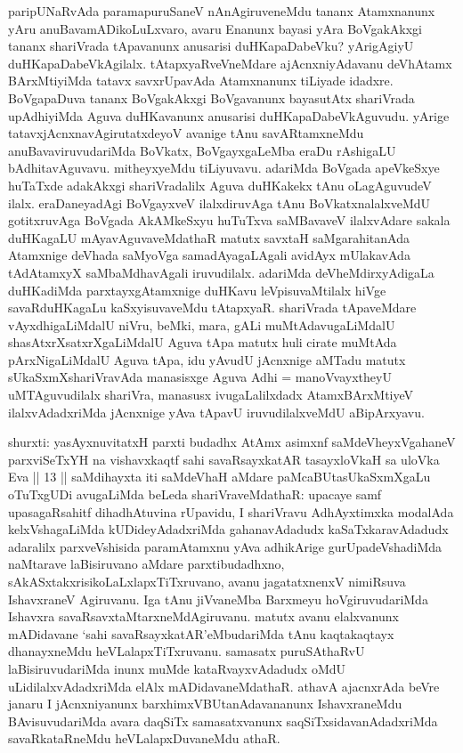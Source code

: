 \begin{artha} %
paripUNaRvAda paramapuruSaneV nAnAgiruveneMdu tananx Atamxnanunx yAru anuBavamADikoLuLxvaro, avaru Enanunx bayasi yAra BoVgakAkxgi tananx shariVrada tApavanunx anusarisi duHKapaDabeVku? yArigAgiyU duHKapaDabeVkAgilalx. tAtapxyaRveVneMdare \ndash  ajAcnxniyAdavanu deVhAtamx BArxMtiyiMda tatavx savxrUpavAda Atamxnanunx tiLiyade idadxre. BoVgapaDuva tananx BoVgakAkxgi BoVgavanunx bayasutAtx shariVrada upAdhiyiMda Aguva duHKavanunx anusarisi duHKapaDabeVkAguvudu. yArige tatavxjAcnxnavAgirutatxdeyoV avanige tAnu savARtamxneMdu anuBavaviruvudariMda BoVkatx, BoVgayxgaLeMba eraDu rAshigaLU bAdhitavAguvavu. mitheyxyeMdu tiLiyuvavu. adariMda BoVgada apeVkeSxye huTaTxde adakAkxgi shariVradalilx Aguva duHKakekx tAnu oLagAguvudeV ilalx. eraDaneyadAgi BoVgayxveV ilalxdiruvAga tAnu BoVkatxnalalxveMdU gotitxruvAga BoVgada AkAMkeSxyu huTuTxva saMBavaveV ilalxvAdare sakala duHKagaLU mAyavAguvaveMdathaR matutx savxtaH saMgarahitanAda Atamxnige deVhada saMyoVga samadAyagaLAgali avidAyx mUlakavAda tAdAtamxyX saMbaMdhavAgali iruvudilalx. adariMda deVheMdirxyAdigaLa duHKadiMda parxtayxgAtamxnige duHKavu leVpisuvaMtilalx hiVge savaRduHKagaLu kaSxyisuvaveMdu tAtapxyaR. shariVrada tApaveMdare vAyxdhigaLiMdalU niVru, beMki, mara, gALi muMtAdavugaLiMdalU shasAtxrXsatxrXgaLiMdalU Aguva tApa matutx huli cirate muMtAda pArxNigaLiMdalU Aguva tApa, idu yAvudU jAcnxnige aMTadu matutx sUkaSxmXshariVravAda manasisxge Aguva Adhi = manoVvayxtheyU uMTAguvudilalx shariVra, manasusx ivugaLalilxdadx AtamxBArxMtiyeV ilalxvAdadxriMda jAcnxnige yAva tApavU iruvudilalxveMdU aBipArxyavu. 
\end{artha}


\vishaya{}

\begin{artha}
shurxti: yasAyxnuvitatxH parxti budadhx AtAmx asimxnf saMdeVheyxVgahaneV parxviSeTxYH na vishavxkaqtf sahi savaRsayxkatAR tasayxloVkaH sa uloVka Eva || 13 || saMdihayxta iti saMdeVhaH aMdare paMcaBUtasUkaSxmXgaLu oTuTxgUDi avugaLiMda beLeda shariVraveMdathaR: upacaye samf upasagaRsahitf dihadhAtuvina rUpavidu, I shariVravu AdhAyxtimxka modalAda kelxVshagaLiMda kUDideyAdadxriMda gahanavAdadudx kaSaTxkaravAdadudx adaralilx parxveVshisida paramAtamxnu yAva adhikArige gurUpadeVshadiMda naMtarave laBisiruvano aMdare parxtibudadhxno, sAkASxtakxrisikoLaLxlapxTiTxruvano, avanu  jagatatxnenxV nimiRsuva IshavxraneV Agiruvanu. Iga tAnu jiVvaneMba Barxmeyu hoVgiruvudariMda Ishavxra savaRsavxtaMtarxneMdAgiruvanu. matutx avanu elalxvanunx mADidavane `sahi savaRsayxkatAR'\ndash  eMbudariMda tAnu kaqtakaqtayx dhanayxneMdu heVLalapxTiTxruvanu. samasatx puruSAthaRvU laBisiruvudariMda inunx muMde kataRvayxvAdadudx oMdU uLidilalxvAdadxriMda elAlx mADidavaneMdathaR. athavA ajacnxrAda beVre janaru I jAcnxniyanunx barxhimxVBUtanAdavananunx IshavxraneMdu BAvisuvudariMda avara daqSiTx samasatxvanunx saqSiTxsidavanAdadxriMda savaRkataRneMdu heVLalapxDuvaneMdu athaR.
\end{artha}

